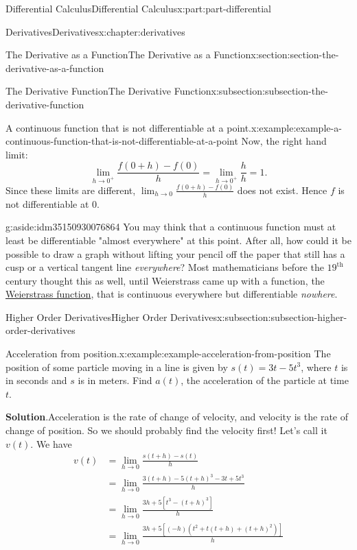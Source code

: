 \documentclass[twoside,10pt,]{book}
\newcommand{\blocktitlefont}{\relax}
\numberwithin{equation}{part}
\begin{document}
\begin{partptx}{Differential Calculus}{}{Differential Calculus}{}{}{x:part:part-differential}
\begin{chapterptx}{Derivatives}{}{Derivatives}{}{}{x:chapter:derivatives}
\begin{sectionptx}{The Derivative as a Function}{}{The Derivative as a Function}{}{}{x:section:section-the-derivative-as-a-function}
\begin{subsectionptx}{The Derivative Function}{}{The Derivative Function}{}{}{x:subsection:subsection-the-derivative-function}
\begin{example}{A continuous function that is not differentiable at a point.}{x:example:example-a-continuous-function-that-is-not-differentiable-at-a-point}
Now, the right hand limit:%
\begin{equation*}
\lim_{h\to0^{+}}\frac{f(0+h)-f(0)}{h} = \lim_{h\to0^{+}}\frac{h}{h} = 1.
\end{equation*}
Since these limits are different, \(\lim_{h\to0}\frac{f(0+h)-f(0)}{h}\) does not exist. Hence \(f\) is not differentiable at \(0\).%
\end{example}
\begin{aside}{}{g:aside:idm35150930076864}%
You may think that a continuous function must at least be differentiable "almost everywhere" at this point. After all, how could it be possible to draw a graph without lifting your pencil off the paper that still has a cusp or a vertical tangent line \emph{everywhere}? Most mathematicians before the \(19^{\text{th}}\) century thought this as well, until Weierstrass came up with a function, the \href{https://en.wikipedia.org/wiki/Weierstrass_function}{Weierstrass function}\footnotemark{}, that is continuous everywhere but differentiable \emph{nowhere}.%
\end{aside}
%
\end{subsectionptx}
%
%
\typeout{************************************************}
\typeout{************************************************}
%
\begin{subsectionptx}{Higher Order Derivatives}{}{Higher Order Derivatives}{}{}{x:subsection:subsection-higher-order-derivatives}
\begin{example}{Acceleration from position.}{x:example:example-acceleration-from-position}%
The position of some particle moving in a line is given by \(s(t) = 3t-5t^{3}\), where \(t\) is in seconds and \(s\) is in meters. Find \(a(t)\), the acceleration of the particle at time \(t\).%
\par\smallskip%
\noindent\textbf{\blocktitlefont Solution}.\hypertarget{g:solution:idm35150930070336}{}\quad{}Acceleration is the rate of change of velocity, and velocity is the rate of change of position. So we should probably find the velocity first! Let's call it \(v(t)\). We have%
\begin{align*}
v(t) & = \lim_{h\to0}\frac{s(t+h) - s(t)}{h} \\
& = \lim_{h\to0}\frac{3(t+h) - 5(t+h)^{3} - 3t + 5t^{3}}{h} \\
& = \lim_{h\to0}\frac{3h + 5[t^{3} - (t+h)^{3}]}{h} \\
& = \lim_{h\to0}\frac{3h + 5[(-h)(t^{2} + t(t+h) + (t+h)^{2})]}{h} \\

\end{align*}
\end{example}
\end{subsectionptx}
\end{sectionptx}
\end{chapterptx}
\end{partptx}
\end{document}
